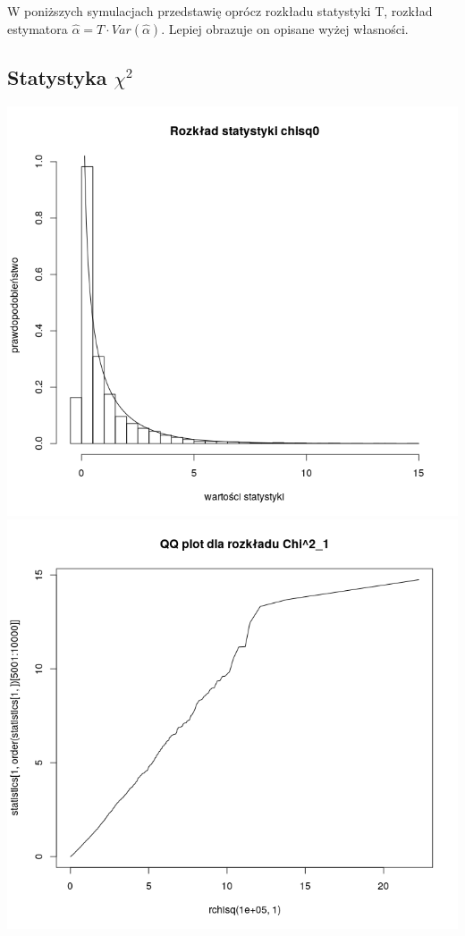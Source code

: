 \documentclass[a4paper,11pt]{article}
\begin{document}
W poniższych symulacjach przedstawię oprócz rozkładu statystyki T, rozkład estymatora $\widehat{\alpha} = T \cdot Var(\widehat{\alpha})$. Lepiej obrazuje on opisane wyżej własności. 



\subsection{Statystyka $\chi^2$}

\includegraphics[scale=.3]{Rplot8.png} 
\includegraphics[scale=.3]{Rplot9.png} 
\end{document}
